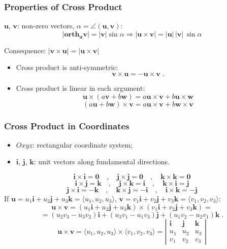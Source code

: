 \begin{frame}
 \frametitle{Properties of Cross Product}

$\textbf{u}$, $\textbf{v}$: non-zero vectors, $\alpha = \angle(\textbf{u},\textbf{v})$:
%
$$|\textbf{orth}_{\bm{u}} \textbf{v}| = |\textbf{v}|\sin\alpha
\Longrightarrow |\textbf{u} \times \textbf{v}| = |\textbf{u}| \, |\textbf{v}| \, \sin{\alpha}$$

Consequence: $|\textbf{v} \times \textbf{u}|  = | \textbf{u} \times \textbf{v}|$

\begin{itemize}
 \item \pause Cross product is anti-symmetric:
%
$$\textbf{v} \times \textbf{u} = - \textbf{u} \times \textbf{v} \; .$$
%
\item \pause Cross product is linear in each argument:
%
$$ \textbf{u} \times (a\textbf{v} + b\textbf{w}) =
a \textbf{u} \times \textbf{v} + b \textbf{u} \times \textbf{w}$$
%
$$(a\textbf{u} + b\textbf{w}) \times \textbf{v} =
a \textbf{u} \times \textbf{v} + b \textbf{w} \times \textbf{v}$$
\end{itemize}

\end{frame}

\begin{frame}
 \frametitle{Cross Product in Coordinates}

\begin{itemize}
 \item  $Oxyz$: rectangular coordinate system;
  \item $\textbf{i}$, $\textbf{j}$, $\textbf{k}$: unit vectors along fundamental directions.\pause
\end{itemize}
%
$$\textbf{i} \times \textbf{i} = \textbf{0} \quad , \quad \textbf{j} \times \textbf{j} =
\textbf{0} \quad , \quad \textbf{k} \times \textbf{k} = \textbf{0}$$
$$\textbf{i} \times \textbf{j} = \textbf{k} \quad , \quad \textbf{j} \times \textbf{k} =
\textbf{i} \quad , \quad \textbf{k} \times \textbf{i} = \textbf{j}$$
$$\textbf{j} \times \textbf{i} = -\textbf{k} \quad , \quad \textbf{k} \times \textbf{j} =
-\textbf{i} \quad , \quad \textbf{i} \times \textbf{k} = -\textbf{j}$$
\pause
If $\textbf{u} = u_1 \textbf{i} + u_2 \textbf{j} + u_3 \textbf{k} = \langle u_1, u_2, u_3 \rangle$,
 $\textbf{v}=v_1 \textbf{i} + v_2 \textbf{j} + v_3 \textbf{k} = \langle v_1, v_2, v_3 \rangle$:
%
$$\textbf{u} \times \textbf{v} = (u_1 \textbf{i} + u_2 \textbf{j} + u_3 \textbf{k})
\times (v_1 \textbf{i} + v_2 \textbf{j} + v_3 \textbf{k})= $$
%
$$= (u_2v_3 -u_3v_2) \textbf{i} + (u_3v_1-u_1v_3) \textbf{j} + (u_1v_2-u_2v_1) \textbf{k} \; .$$
\pause
$$\textbf{u} \times \textbf{v} = \langle u_1, u_2, u_3 \rangle \times \langle v_1, v_2, v_3 \rangle =
\left|  \begin{array}{ccc}
      \textbf{i} & \textbf{j} & \textbf{k} \\
      u_1 & u_2 & u_3 \\
      v_1 & v_2 & v_3
        \end{array}
\right|$$
\end{frame}

